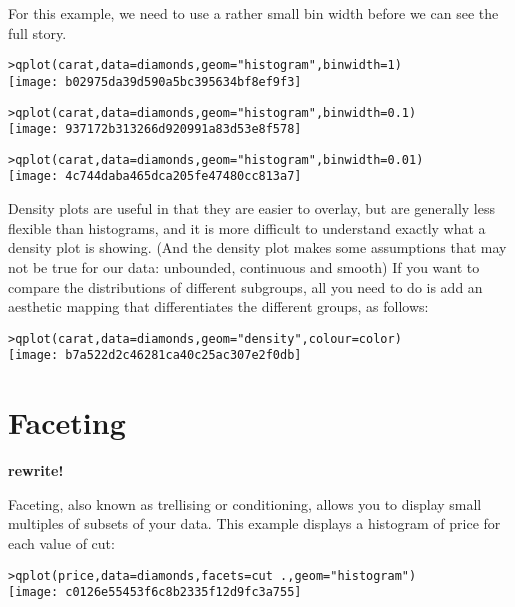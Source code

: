 For this example, we need to use a rather small bin width before we can see the full story.

\begin{alltt}
> qplot(carat, data = diamonds, geom = "histogram", binwidth = 1)
\texttt{[image: b02975da39d590a5bc395634bf8ef9f3]}

> qplot(carat, data = diamonds, geom = "histogram", binwidth = 0.1)
\texttt{[image: 937172b313266d920991a83d53e8f578]}

> qplot(carat, data = diamonds, geom = "histogram", binwidth = 0.01)
\texttt{[image: 4c744daba465dca205fe47480cc813a7]}

\end{alltt}

Density plots are useful in that they are easier to overlay, but are generally less flexible than histograms, and it is more difficult to understand exactly what a density plot is showing.  (And the density plot makes some assumptions that may not be true for our data: unbounded, continuous and smooth)  If you want to compare the distributions of different subgroups, all you need to do is add an aesthetic mapping that differentiates the different groups, as follows:

\begin{alltt}
> qplot(carat, data = diamonds, geom = "density", colour = color)
\texttt{[image: b7a522d2c46281ca40c25ac307e2f0db]}

\end{alltt}


\section{Faceting}\label{sec:faceting}

{\bf rewrite!}

Faceting, also known as trellising or conditioning, allows you to display small multiples of subsets of your data.  This example displays a histogram of price for each value of cut:

\begin{alltt}
> qplot(price, data = diamonds, facets = cut ~ ., geom = "histogram")
\texttt{[image: c0126e55453f6c8b2335f12d9fc3a755]}

\end{alltt}

